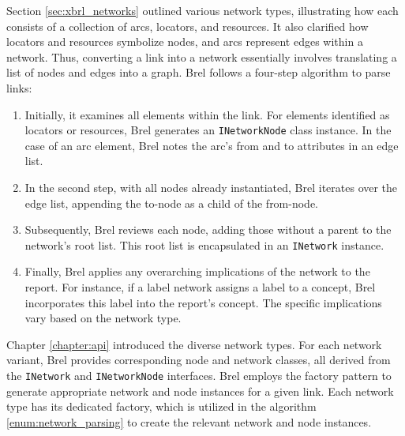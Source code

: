 Section \ref{sec:xbrl_networks} outlined various network types, illustrating how each consists of a collection of arcs, locators, and resources.
It also clarified how locators and resources symbolize nodes, and arcs represent edges within a network.
Thus, converting a link into a network essentially involves translating a list of nodes and edges into a graph.
Brel follows a four-step algorithm to parse links:

\begin{enumerate}\label{enum:network_parsing}
    \item Initially, it examines all elements within the link. 
    For elements identified as locators or resources, Brel generates an \texttt{INetworkNode} class instance.
    In the case of an arc element, Brel notes the arc's from and to attributes in an edge list.
    \item In the second step, with all nodes already instantiated, Brel iterates over the edge list, appending the to-node as a child of the from-node.
    \item Subsequently, Brel reviews each node, adding those without a parent to the network's root list. This root list is encapsulated in an \texttt{INetwork} instance.
    \item Finally, Brel applies any overarching implications of the network to the report.
    For instance, if a label network assigns a label to a concept, Brel incorporates this label into the report's concept.
    The specific implications vary based on the network type.
\end{enumerate}

Chapter \ref{chapter:api} introduced the diverse network types.
For each network variant, Brel provides corresponding node and network classes, 
all derived from the \texttt{INetwork} and \texttt{INetworkNode} interfaces.
Brel employs the factory pattern to generate appropriate network and node instances for a given link.
Each network type has its dedicated factory, which is utilized in the algorithm \ref{enum:network_parsing} to create the relevant network and node instances.




